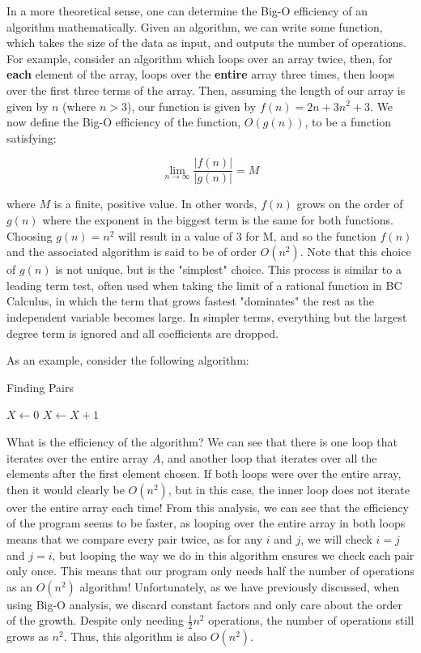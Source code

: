 In a more theoretical sense, one can determine the Big-O efficiency of an algorithm mathematically.  Given an algorithm, we can write some function, which takes the size of the data as input, and outputs the number of operations.  For example, consider an algorithm which loops over an array twice, then, for \textbf{each} element of the array, loops over the \textbf{entire} array three times, then loops over the first three terms of the array.  Then, assuming the length of our array is given by $ n $ (where $ n > 3 $), our function is given by $ f(n) = 2n + 3n^2 + 3 $.  We now define the Big-O efficiency of the function, $ O(g(n)) $, to be a function satisfying:

$$ \lim_{n \to \infty}{\frac{|f(n)|}{|g(n)|}} = M $$

\noindent where $ M $ is a finite, positive value.  In other words, $ f(n) $ grows on the order of $ g(n) $ where the exponent in the biggest term is the same for both functions.  Choosing $ g(n) = n^2 $ will result in a value of $ 3 $ for M, and so the function $ f(n) $ and the associated algorithm is said to be of order $ O(n^2) $.  Note that this choice of $ g(n) $ is not unique, but is the "simplest" choice.  This process is similar to a leading term test, often used when taking the limit of a rational function in BC Calculus, in which the term that grows fastest "dominates" the rest as the independent variable becomes large. In simpler terms, everything but the largest degree term is ignored and all coefficients are dropped.

As an example, consider the following algorithm:

\begin{algorithm}[H]
\caption{Finding Pairs}
\begin{algorithmic}
\State $ X \gets 0 $
            \State $X \gets X + 1$
        \EndIf
    \EndFor
\EndFor
\end{algorithmic}
\end{algorithm}


What is the efficiency of the algorithm?  We can see that there is one loop that iterates over the entire array $ A $, and another loop that iterates over all the elements after the first element chosen.  If both loops were over the entire array, then it would clearly be $ O(n^2) $, but in this case, the inner loop does not iterate over the entire array each time!  From this analysis, we can see that the efficiency of the program seems to be faster, as looping over the entire array in both loops means that we compare every pair twice, as for any $ i $ and $ j $, we will check $ i = j $ and $ j = i $, but looping the way we do in this algorithm ensures we check each pair only once.  This means that our program only needs half the number of operations as an $ O(n^2) $ algorithm!  Unfortunately, as we have previously discussed, when using Big-O analysis, we discard constant factors and only care about the order of the growth.  Despite only needing $ \frac{1}{2}n^2 $ operations, the number of operations still grows as $n^2$.  Thus, this algorithm is also $ O(n^2) $.

